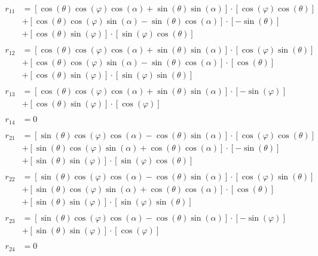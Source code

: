 \documentclass[a4paper]{article}
\theoremstyle{hangindent}
\theoremstyle{hangindent}
\begin{document}
\begin{align*}
    r_{11}
    &= \left[ \cos(\theta)\cos(\varphi)\cos(\alpha) + \sin(\theta)\sin(\alpha) \right] \cdot \left[\cos(\varphi)\cos(\theta)\right] \\
    &+ \left[ \cos(\theta)\cos(\varphi)\sin(\alpha) - \sin(\theta)\cos(\alpha) \right] \cdot \left[-\sin(\theta)\right] \\
    &+ \left[\cos(\theta)\sin(\varphi)\right] \cdot \left[\sin(\varphi)\cos(\theta)\right] \\
    \\
    r_{12}
    &= \left[ \cos(\theta)\cos(\varphi)\cos(\alpha) + \sin(\theta)\sin(\alpha) \right] \cdot \left[ \cos(\varphi)\sin(\theta) \right] \\
    &+ \left[ \cos(\theta)\cos(\varphi)\sin(\alpha) - \sin(\theta)\cos(\alpha) \right] \cdot \left[\cos(\theta)\right] \\
    &+ \left[\cos(\theta)\sin(\varphi)\right] \cdot \left[\sin(\varphi)\sin(\theta)\right] \\
    \\
    r_{13}
    &= \left[ \cos(\theta)\cos(\varphi)\cos(\alpha) + \sin(\theta)\sin(\alpha) \right] \cdot \left[-\sin(\varphi)\right] \\
    &+ \left[\cos(\theta)\sin(\varphi)\right] \cdot \left[\cos(\varphi)\right] \\
    \\
    r_{14} &= 0 \\
\end{align*}
\begin{align*}
    r_{21}
    &= \left[ \sin(\theta)\cos(\varphi)\cos(\alpha) - \cos(\theta)\sin(\alpha) \right] \cdot \left[\cos(\varphi)\cos(\theta)\right] \\
    &+ \left[ \sin(\theta)\cos(\varphi)\sin(\alpha) + \cos(\theta)\cos(\alpha) \right] \cdot \left[-\sin(\theta)\right] \\
    &+ \left[\sin(\theta)\sin(\varphi)\right] \cdot \left[\sin(\varphi)\cos(\theta)\right] \\
    \\
    r_{22}
    &= \left[ \sin(\theta)\cos(\varphi)\cos(\alpha) - \cos(\theta)\sin(\alpha) \right] \cdot \left[\cos(\varphi)\sin(\theta)\right] \\
    &+ \left[ \sin(\theta)\cos(\varphi)\sin(\alpha) + \cos(\theta)\cos(\alpha) \right] \cdot \left[\cos(\theta)\right] \\
    &+ \left[\sin(\theta)\sin(\varphi)\right] \cdot \left[\sin(\varphi)\sin(\theta)\right] \\
    \\
    r_{23}
    &= \left[ \sin(\theta)\cos(\varphi)\cos(\alpha) - \cos(\theta)\sin(\alpha) \right] \cdot \left[-\sin(\varphi)\right] \\
    &+ \left[\sin(\theta)\sin(\varphi)\right] \cdot \left[\cos(\varphi)\right] \\
    \\
    r_{24} &= 0 \\
    \\
\end{align*}
\end{document}
